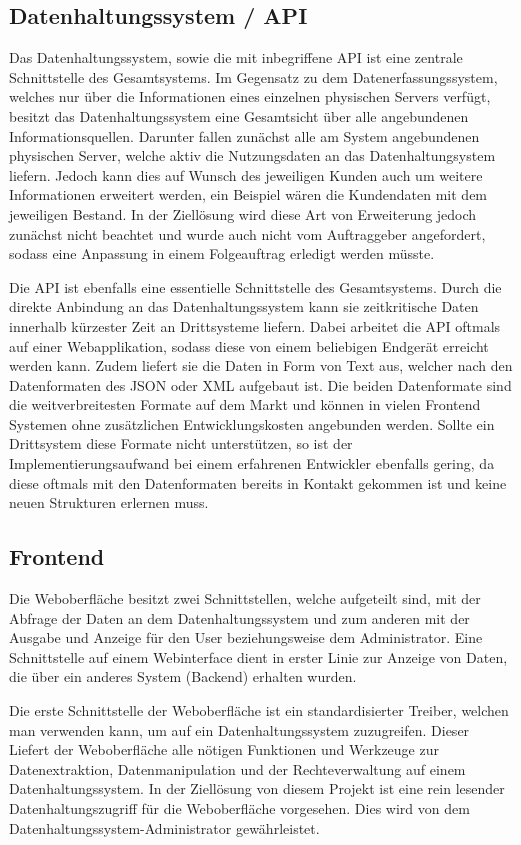\subsection{Datenhaltungssystem / API}
Das Datenhaltungssystem, sowie die mit inbegriffene API ist eine zentrale
Schnittstelle des Gesamtsystems. Im Gegensatz zu dem Datenerfassungssystem,
welches nur über die Informationen eines einzelnen physischen Servers verfügt,
besitzt das Datenhaltungssystem eine Gesamtsicht über alle angebundenen
Informationsquellen. Darunter fallen zunächst alle am System angebundenen
physischen Server, welche aktiv die Nutzungsdaten an das Datenhaltungsystem
liefern. Jedoch kann dies auf Wunsch des jeweiligen Kunden auch um weitere
Informationen erweitert werden, ein Beispiel wären die Kundendaten mit dem
jeweiligen Bestand. In der Ziellösung wird diese Art von Erweiterung
jedoch zunächst nicht beachtet und wurde auch nicht vom Auftraggeber
angefordert, sodass eine Anpassung in einem Folgeauftrag erledigt werden
müsste.

Die API ist ebenfalls eine essentielle Schnittstelle des Gesamtsystems. Durch
die direkte Anbindung an das Datenhaltungssystem kann sie zeitkritische Daten
innerhalb kürzester Zeit an Drittsysteme liefern. Dabei arbeitet die API
oftmals auf einer Webapplikation, sodass diese von einem beliebigen Endgerät
erreicht werden kann. Zudem liefert sie die Daten in Form von Text aus, welcher
nach den Datenformaten des \gls{JSON} oder \gls{XML} aufgebaut ist. Die beiden
Datenformate sind die weitverbreitesten Formate auf dem Markt und können in
vielen Frontend Systemen ohne zusätzlichen Entwicklungskosten angebunden
werden.  Sollte ein Drittsystem diese Formate nicht unterstützen, so ist der
Implementierungsaufwand bei einem erfahrenen Entwickler ebenfalls gering, da
diese oftmals mit den Datenformaten bereits in Kontakt gekommen ist und keine
neuen Strukturen erlernen muss.
\nl%

\subsection{Frontend}
Die Weboberfläche besitzt zwei Schnittstellen, welche aufgeteilt sind, mit der
Abfrage der Daten an dem Datenhaltungssystem und zum anderen mit der Ausgabe
und Anzeige für den User beziehungsweise dem Administrator. Eine Schnittstelle
auf einem Webinterface dient in erster Linie zur Anzeige von Daten, die über
ein anderes System (Backend) erhalten wurden.

Die erste Schnittstelle der Weboberfläche ist ein standardisierter Treiber,
welchen man verwenden kann, um auf ein Datenhaltungssystem zuzugreifen. Dieser
Liefert der Weboberfläche alle nötigen Funktionen und Werkzeuge zur
Datenextraktion, Datenmanipulation und der Rechteverwaltung auf einem
Datenhaltungssystem. In der Ziellösung von diesem Projekt ist eine rein
lesender Datenhaltungszugriff für die Weboberfläche vorgesehen. Dies wird von
dem Datenhaltungssystem-Administrator gewährleistet.

